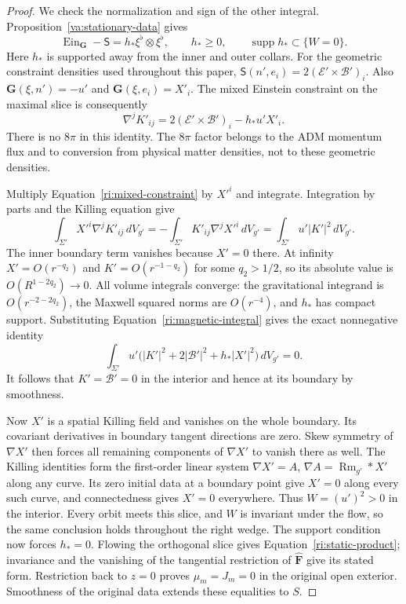 \begin{proof}
We check the normalization and sign of the other integral.
Proposition~\ref{va:stationary-data} gives
\[
 \operatorname{Ein}_{\mathbf G}-\mathsf S
       =h_*\xi^\flat\otimes\xi^\flat,
 \qquad h_*\geq0,\qquad\operatorname{supp}h_*\subset\{W=0\}.
\]
Here $h_*$ is supported away from the inner and outer collars.
For the geometric constraint densities used throughout this paper,
$\mathsf S(n',e_i)=2(\mathcal E'\times\mathcal B')_i$.
Also $\mathbf G(\xi,n')=-u'$ and
$\mathbf G(\xi,e_i)=X'_i$.  The mixed Einstein constraint on the
maximal slice is consequently
\begin{equation}
\label{ri:mixed-constraint}
 \nabla^jK'_{ij}
      =2(\mathcal E'\times\mathcal B')_i-h_*u'X'_i.
\end{equation}
There is no $8\pi$ in this identity.  The $8\pi$ factor belongs to
the ADM momentum flux and to conversion from physical matter
densities, not to these geometric densities.

Multiply Equation~\eqref{ri:mixed-constraint} by $X'^i$ and
integrate.  Integration by parts and the Killing equation give
\[
 \int_{\Sigma'} X'^i\nabla^jK'_{ij}\,dV_{g'}
      =-\int_{\Sigma'}K'_{ij}\nabla^jX'^i\,dV_{g'}
      =\int_{\Sigma'}u'|K'|^2\,dV_{g'}.
\]
The inner boundary term vanishes because $X'=0$ there.  At infinity
$X'=O(r^{-q_2})$ and $K'=O(r^{-1-q_2})$ for some $q_2>1/2$,
so its absolute value is $O(R^{1-2q_2})\to0$.  All volume integrals
converge: the gravitational integrand is $O(r^{-2-2q_2})$, the
Maxwell squared norms are $O(r^{-4})$, and $h_*$ has compact
support.  Substituting Equation~\eqref{ri:magnetic-integral} gives
the exact nonnegative identity
\begin{equation}
\label{ri:staticity-integral}
 \int_{\Sigma'}u'
       \bigl(|K'|^2+2|\mathcal B'|^2+h_*|X'|^2\bigr)\,dV_{g'}=0.
\end{equation}
It follows that $K'=\mathcal B'=0$ in the interior and hence at its
boundary by smoothness.

Now $X'$ is a spatial Killing field and vanishes on the whole
boundary.  Its covariant derivatives in boundary tangent
directions are zero.  Skew symmetry of $\nabla X'$ then forces
all remaining components of $\nabla X'$ to vanish there as well.
The Killing identities form the first-order linear system
$\nabla X'=A$, $\nabla A=\operatorname{Rm}_{g'}*X'$ along any
curve.  Its zero initial data at a boundary point give $X'=0$
along every such curve, and connectedness gives $X'=0$ everywhere.
Thus $W=(u')^2>0$ in the interior.  Every orbit meets this slice,
and $W$ is invariant under the flow, so the same conclusion holds
throughout the right wedge.  The support condition now forces
$h_*=0$.  Flowing the orthogonal slice gives
Equation~\eqref{ri:static-product}; invariance and the vanishing of
the tangential restriction of $\widehat{\mathbf F}$ give its stated
form.  Restriction back to $z=0$ proves $\mu_m=J_m=0$ in the
original open exterior.  Smoothness of the original data extends
these equalities to $S$.
\end{proof}

